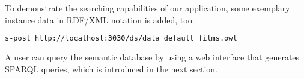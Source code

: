 To demonstrate the searching capabilities of our application, some exemplary instance data in RDF/XML notation is added, too.
\begin{lstlisting}[language=bash]
s-post http://localhost:3030/ds/data default films.owl
\end{lstlisting}

A user can query the semantic database by using a web interface that generates SPARQL queries, which is introduced in the next section.